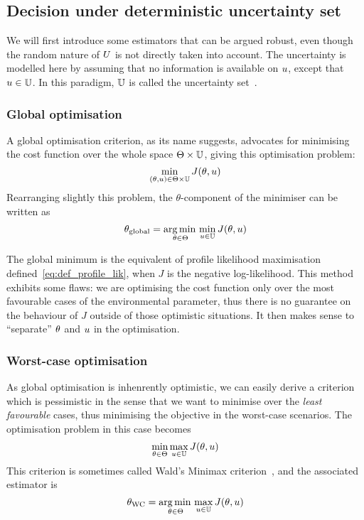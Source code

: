 \documentclass[../../Main_ManuscritThese.tex]{subfiles}
\begin{document}
\subsection{Decision under deterministic uncertainty set}
We will first introduce some estimators that can be argued robust, even
though the random nature of $U$ is not directly taken into account.
The uncertainty is modelled here by assuming that no information is
available on $u$, except that $u \in \mathbb{U}$. In this paradigm,
$\mathbb{U}$ is called the uncertainty set~\citep{bertsimas_theory_2010}.

\subsubsection{Global optimisation}
A global optimisation criterion, as its name suggests, advocates for minimising the cost function over the whole space $\Theta \times \mathbb{U}$, giving this optimisation problem:
\begin{equation}
  \min_{(\theta,u) \in \Theta \times \mathbb{U}} J(\theta, u)
\end{equation}
Rearranging slightly this problem, the $\theta$-component of the minimiser can be written as
\begin{equation}
  \label{eq:kkglobal}
  {\theta}_{\mathrm{global}} = \operatorname*{arg\,min \,}_{\theta \in \Theta} \min_{u \in \mathbb{U}} J(\theta, u)
\end{equation}

The global minimum is the equivalent of profile likelihood
maximisation defined~\cref{eq:def_profile_lik}, when $J$ is the negative
log-likelihood. This method exhibits some flaws: we are optimising the
cost function only over the most favourable cases of the environmental
parameter, thus there is no guarantee on the behaviour of $J$ outside
of those optimistic situations.  It then makes sense to ``separate''
$\theta$ and $u$ in the optimisation.

\subsubsection{Worst-case optimisation}
\label{sec:saddle_point}
As global optimisation is inhenrently optimistic, we can easily derive
a criterion which is pessimistic in the sense that we want to minimise
over the \emph{least favourable} cases, thus minimising the objective
in the worst-case scenarios. The optimisation problem in this case
becomes
\begin{equation}
  \min_{\theta\in\Theta} \max_{u \in \mathbb{U}} J(\theta,u)
\end{equation}
This criterion is sometimes called Wald's Minimax criterion~\citep{wald_statistical_1945}, and the associated estimator is
\begin{equation}
  \label{eq:kkwc}
  {\theta}_{\mathrm{WC}} =  \operatorname*{arg\,min \,}_{\theta \in \Theta} \max_{u \in \mathbb{U}} J(\theta, u)
\end{equation}
\end{document}
